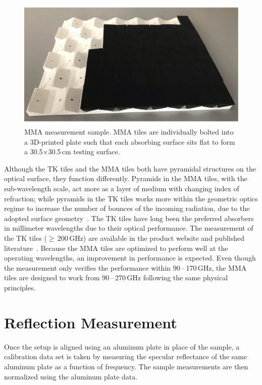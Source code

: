 \begin{figure}
    \centering
\includegraphics[width = \textwidth]{Figures/flat_sample.pdf}
    \caption{MMA measurement sample. MMA tiles are individually bolted into a 3D-printed plate such that each absorbing surface sits flat to form a 30.5$\times$30.5\,cm testing surface.}
    \label{fig:front_tiles}
\end{figure}

Although the TK tiles and the MMA tiles both have pyramidal structures on the optical surface, they function differently. Pyramids in the MMA tiles, with the sub-wavelength scale, act more as a layer of medium with changing index of refraction; while pyramids in the TK tiles works more within the geometric optics regime to increase the number of bounces of the incoming radiation, due to the adopted surface geometry~\cite{Chuss2017}. The TK tiles have long been the preferred absorbers in millimeter wavelengths due to their optical performance. The measurement of the TK tiles ($\geq$\,200\,GHz) are available in the product website and published literature~\cite{Saily/etal:2004}. Because the MMA tiles are optimized to perform well at the operating wavelengths, an improvement in performance is expected. Even though the measurement only verifies the performance within 90\,--\,170\,GHz, the MMA tiles are designed to work from 90\,--\,270\,GHz following the same physical principles.
\section{Reflection Measurement}

Once the setup is aligned using an aluminum plate in place of the sample, a calibration data set is taken by measuring the specular reflectance of the same aluminum plate as a function of frequency. The sample measurements are then normalized using the aluminum plate data. 

